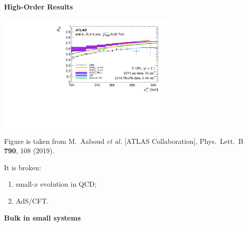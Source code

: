 \documentclass[9pt,a4paper,unknownkeysallowed,xcolor=dvipsnames,aspectratio=43]{beamer}
\begin{document}
\begin{frame}{\bf\huge High-Order Results}	\vspace{4mm}
\begin{center}
\includegraphics[width=0.65\textwidth]{fig/RAA_jet}\\
{\tiny  Figure is taken from {\color{teablue}
M.~Aaboud {\it et al.} [ATLAS Collaboration],
  Phys.\ Lett.\ B {\bf 790}, 108 (2019).
  }}
\end{center}
\vspace{4mm}
{\large It is broken:}
\vspace{2mm}
\begin{enumerate}
\item{small-$x$ evolution in QCD;}
\vspace{4mm}
\item{AdS/CFT.}
\end{enumerate}
\end{frame}
%
%
\setcounter{page}{0}
\begin{frame}
\vspace*{\fill}
\begin{center}
{\Huge\bf\color{gray} Bulk in small systems}
\end{center}
\vspace*{\fill}
\end{frame}
\end{document}
